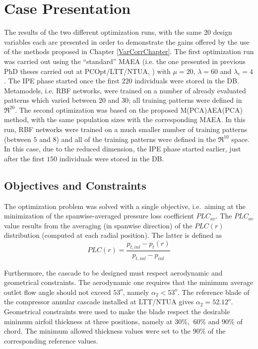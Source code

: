 \section{Case Presentation}

The results of the two different optimization runs, with the same $20$ design variables each are presented in order to demonstrate the gains offered by the use of the methods proposed in Chapter \ref{VarCorrChapter}.  
The first optimization run was carried out using the ``standard'' MAEA (i.e. the one presented in previous PhD theses carried out at PCOpt/LTT/NTUA, \cite{phd_Karakasis,phd_Kampolis}) with $\mu\!=\!20$, $\lambda\!=\!60$ and $\lambda_e\!=\!4$. The IPE phase started once the first $220$ individuals were stored in the DB. Metamodels, i.e. RBF networks, were trained on a number of already evaluated patterns which varied between $20$ and $30$; all training patterns were defined in $\Re^{20}$. The second optimization was based on the proposed M(PCA)AEA(PCA) method, with the same population sizes with the corresponding MAEA. In this run, RBF networks were trained on a much smaller number of training patterns (between $5$ and $8$) and all of the training patterns were defined in the $\Re^{10}$ space. In this case, due to the reduced dimension, the IPE phase started earlier, just after the first $150$ individuals were stored in the DB.     

   
\subsection{Objectives and Constraints}
The optimization problem was solved with a single objective, i.e.\ aiming at the minimization of the spanwise-averaged pressure loss coefficient
$PLC_{av}$. The $PLC_{av}$ value results from the averaging (in spanwise direction) of the $PLC(r)$ distribution (computed at each radial position). The latter is defined as     
\begin{equation}
PLC(r)=\frac{p_{t,inl}-p_t(r)}{p_{t,inl}-p_{inl}}
\label{res:ntua_blade:plc}
\end{equation}

Furthermore, the cascade to be designed must respect aerodynamic and geometrical constraints. The aerodynamic one requires that the minimum average outlet flow angle should not exceed $53^o$, namely $\alpha_2<53^o$. The reference blade of the compressor annular cascade installed at LTT/NTUA gives $\alpha_2\!=\!52.12^o$. Geometrical constraints were used to make the blade respect the desirable minimum airfoil thickness at three positions, namely at $30\%$, $~60\%$ and $90\%$ of chord. The minimum allowed thickness values were set to the $90\%$ of the corresponding reference values.      


